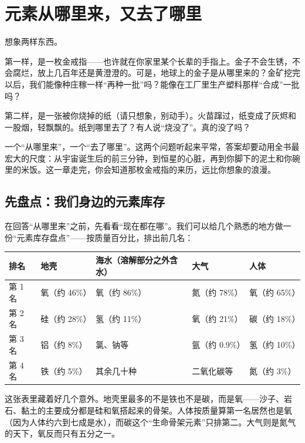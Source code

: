 \chapter{元素从哪里来，又去了哪里}

\begin{kaichang}
想象两样东西。

第一样，是一枚金戒指——也许就在你家里某个长辈的手指上。金子不会生锈，不会腐烂，放上几百年还是黄澄澄的。可是，地球上的金子是从哪里来的？金矿挖完以后，我们能像种庄稼一样“再种一批”吗？能像在工厂里生产塑料那样“合成”一批吗？

第二样，是一张被你烧掉的纸（请只想象，别动手）。火苗蹿过，纸变成了灰烬和一股烟，轻飘飘的。纸到哪里去了？有人说“烧没了”。真的没了吗？

一个“从哪里来”，一个“去了哪里”。这两个问题听起来平常，答案却要动用全书最宏大的尺度：从宇宙诞生后的前三分钟，到恒星的心脏，再到你脚下的泥土和你碗里的米饭。这一章走完，你会知道那枚金戒指的来历，远比你想象的浪漫。
\end{kaichang}

\section{先盘点：我们身边的元素库存}

在回答“从哪里来”之前，先看看“现在都在哪”。我们可以给几个熟悉的地方做一份“元素库存盘点”——按质量百分比，排出前几名：

\begin{table}[htbp]
\centering
\begin{tabular}{lllll}
\toprule
排名 & 地壳 & 海水（溶解部分之外含水） & 大气 & 人体 \\
\midrule
第 1 名 & 氧（约 46\%） & 氧（约 86\%） & 氮（约 78\%） & 氧（约 65\%） \\
第 2 名 & 硅（约 28\%） & 氢（约 11\%） & 氧（约 21\%） & 碳（约 18\%） \\
第 3 名 & 铝（约 8\%） & 氯、钠等 & 氩（约 0.9\%） & 氢（约 10\%） \\
第 4 名 & 铁（约 5\%） & 其余几十种 & 二氧化碳等 & 氮（约 3\%） \\
\bottomrule
\end{tabular}
\end{table}

这张表里藏着好几个意外。地壳里最多的不是铁也不是碳，而是氧——沙子、岩石、黏土的主要成分都是硅和氧搭起来的骨架。人体按质量算第一名居然也是氧（因为人体约六到七成是水），而碳这个“生命骨架元素”只排第二。大气则是氮气的天下，氧反而只有五分之一。

